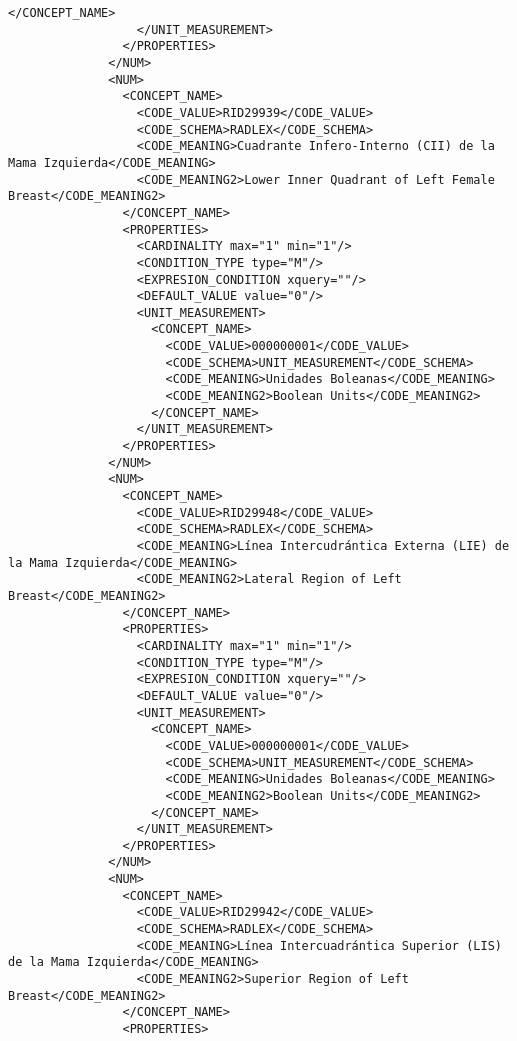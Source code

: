 \begin{lstlisting}[label=some-code,caption=Some Code]
                    </CONCEPT_NAME>
                  </UNIT_MEASUREMENT>
                </PROPERTIES>
              </NUM>
              <NUM>
                <CONCEPT_NAME>
                  <CODE_VALUE>RID29939</CODE_VALUE>
                  <CODE_SCHEMA>RADLEX</CODE_SCHEMA>
                  <CODE_MEANING>Cuadrante Infero-Interno (CII) de la Mama Izquierda</CODE_MEANING>
                  <CODE_MEANING2>Lower Inner Quadrant of Left Female Breast</CODE_MEANING2>
                </CONCEPT_NAME>
                <PROPERTIES>
                  <CARDINALITY max="1" min="1"/>
                  <CONDITION_TYPE type="M"/>
                  <EXPRESION_CONDITION xquery=""/>
                  <DEFAULT_VALUE value="0"/>
                  <UNIT_MEASUREMENT>
                    <CONCEPT_NAME>
                      <CODE_VALUE>000000001</CODE_VALUE>
                      <CODE_SCHEMA>UNIT_MEASUREMENT</CODE_SCHEMA>
                      <CODE_MEANING>Unidades Boleanas</CODE_MEANING>
                      <CODE_MEANING2>Boolean Units</CODE_MEANING2>
                    </CONCEPT_NAME>
                  </UNIT_MEASUREMENT>
                </PROPERTIES>
              </NUM>
              <NUM>
                <CONCEPT_NAME>
                  <CODE_VALUE>RID29948</CODE_VALUE>
                  <CODE_SCHEMA>RADLEX</CODE_SCHEMA>
                  <CODE_MEANING>Línea Intercudrántica Externa (LIE) de la Mama Izquierda</CODE_MEANING>
                  <CODE_MEANING2>Lateral Region of Left Breast</CODE_MEANING2>
                </CONCEPT_NAME>
                <PROPERTIES>
                  <CARDINALITY max="1" min="1"/>
                  <CONDITION_TYPE type="M"/>
                  <EXPRESION_CONDITION xquery=""/>
                  <DEFAULT_VALUE value="0"/>
                  <UNIT_MEASUREMENT>
                    <CONCEPT_NAME>
                      <CODE_VALUE>000000001</CODE_VALUE>
                      <CODE_SCHEMA>UNIT_MEASUREMENT</CODE_SCHEMA>
                      <CODE_MEANING>Unidades Boleanas</CODE_MEANING>
                      <CODE_MEANING2>Boolean Units</CODE_MEANING2>
                    </CONCEPT_NAME>
                  </UNIT_MEASUREMENT>
                </PROPERTIES>
              </NUM>
              <NUM>
                <CONCEPT_NAME>
                  <CODE_VALUE>RID29942</CODE_VALUE>
                  <CODE_SCHEMA>RADLEX</CODE_SCHEMA>
                  <CODE_MEANING>Línea Intercuadrántica Superior (LIS) de la Mama Izquierda</CODE_MEANING>
                  <CODE_MEANING2>Superior Region of Left Breast</CODE_MEANING2>
                </CONCEPT_NAME>
                <PROPERTIES>

\end{lstlisting}

